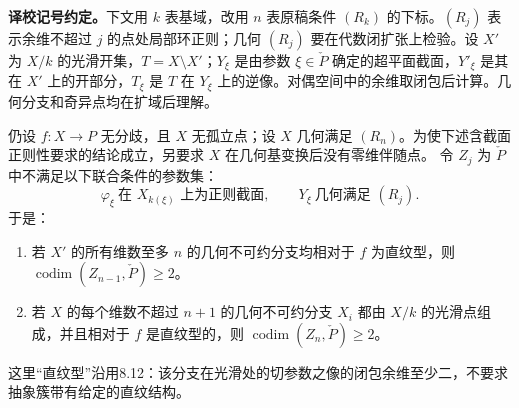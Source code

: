 \begingroup
\def\PP{\mathbb P}\def\OO{\mathcal O}\def\Ocal{\mathcal O}
\def\F{\mathcal F}\def\G{\mathcal G}\def\N{\mathcal N}
\def\PD{\check P}\def\Pdual{\check P}
\def\Ys{Y^{\mathrm{sing}}}\def\Ysing{Y^{\mathrm{sing}}}
\def\Ds{Y^{\mathrm{sup\,sing}}}\def\Ysup{Y^{\mathrm{sup\,sing}}}
\def\cod{\operatorname{codim}}\def\Sing{\operatorname{Sing}}
\def\depth{\operatorname{depth}}\def\coprof{\operatorname{coprof}}
\def\Ass{\operatorname{Ass}}\def\Supp{\operatorname{Supp}}
\def\Gr{\operatorname{Gr}}\def\Spec{\operatorname{Spec}}\def\Proj{\operatorname{Proj}}
\noindent\textbf{译校记号约定。}下文用 $k$ 表基域，改用 $n$ 表原稿条件 $(R_k)$ 的下标。$(R_j)$ 表示余维不超过 $j$ 的点处局部环正则；几何 $(R_j)$ 要在代数闭扩张上检验。设 $X'$ 为 $X/k$ 的光滑开集，$T=X\setminus X'$；$Y_\xi$ 是由参数 $\xi\in\PD$ 确定的超平面截面，$Y'_\xi$ 是其在 $X'$ 上的开部分，$T_\xi$ 是 $T$ 在 $Y_\xi$ 上的逆像。对偶空间中的余维取闭包后计算。几何分支和奇异点均在扩域后理解。

仍设 $f:X\to P$ 无分歧，且 $X$ 无孤立点；设 $X$ 几何满足 $(R_n)$。为使下述含截面正则性要求的结论成立，另要求 $X$ 在几何基变换后没有零维伴随点。
令 $Z_j$ 为 $\PD$ 中不满足以下联合条件的参数集：
\[
 \varphi_\xi\ \text{在 }X_{k(\xi)}\text{ 上为正则截面},
 \qquad Y_\xi\ \text{几何满足 }(R_j).
\]
于是：
\begin{enumerate}
\item[(a)] 若 $X'$ 的所有维数至多 $n$ 的几何不可约分支均相对于 $f$ 为直纹型，则 $\cod(Z_{n-1},\PD)\ge2$。
\item[(b)] 若 $X$ 的每个维数不超过 $n+1$ 的几何不可约分支 $X_i$ 都由 $X/k$ 的光滑点组成，并且相对于 $f$ 是直纹型的，则 $\cod(Z_n,\PD)\ge2$。
\end{enumerate}
这里“直纹型”沿用8.12：该分支在光滑处的切参数之像的闭包余维至少二，不要求抽象簇带有给定的直纹结构。


